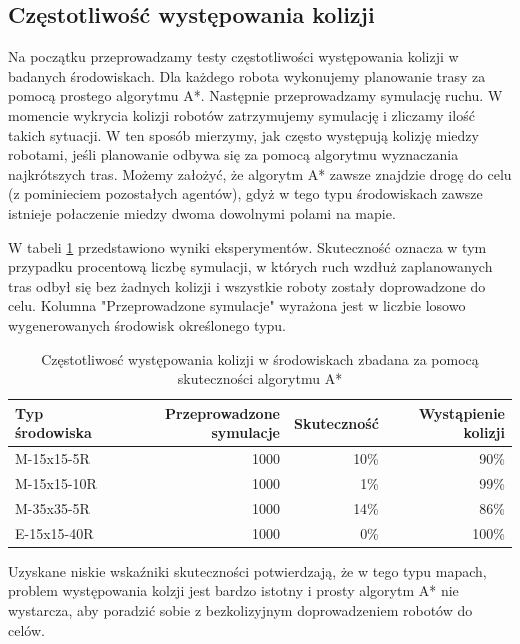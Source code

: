 \subsection{Częstotliwość występowania kolizji} %
Na początku przeprowadzamy testy częstotliwości występowania kolizji w badanych środowiskach.
Dla każdego robota wykonujemy planowanie trasy za pomocą prostego algorytmu A*. Następnie przeprowadzamy symulację ruchu. W momencie wykrycia kolizji robotów zatrzymujemy symulację i zliczamy ilość takich sytuacji. W ten sposób mierzymy, jak często występują kolizję miedzy robotami, jeśli planowanie odbywa się za pomocą algorytmu wyznaczania najkrótszych tras.
Możemy założyć, że algorytm A* zawsze znajdzie drogę do celu (z pominieciem pozostałych agentów), gdyż w tego typu środowiskach zawsze istnieje połaczenie miedzy dwoma dowolnymi polami na mapie.

W tabeli \ref{tab:test-collision-frequency} przedstawiono wyniki eksperymentów. Skuteczność oznacza w tym przypadku procentową liczbę symulacji, w których ruch wzdłuż zaplanowanych tras odbył się bez żadnych kolizji i wszystkie roboty zostały doprowadzone do celu.
Kolumna "Przeprowadzone symulacje" wyrażona jest w liczbie losowo wygenerowanych środowisk określonego typu.

\begin{table}
\caption{Częstotliwosć występowania kolizji w środowiskach zbadana za pomocą skuteczności algorytmu A*} \label{tab:test-collision-frequency} 
\centering
\begin{tabular}{| l | r | r | r |}
\hline
{\bf Typ środowiska} & {\bf Przeprowadzone symulacje} & {\bf Skuteczność} & {\bf Wystąpienie kolizji} \\ \hline
M-15x15-5R  & 1000 & 10\% & 90\% \\ \hline
M-15x15-10R & 1000 & 1\%  & 99\%  \\ \hline
M-35x35-5R  & 1000 & 14\% & 86\% \\ \hline
E-15x15-40R & 1000 & 0\%  & 100\%  \\ \hline
\end{tabular}
\end{table}

Uzyskane niskie wskaźniki skuteczności potwierdzają, że w tego typu mapach, problem występowania kolzji jest bardzo istotny i prosty algorytm A* nie wystarcza, aby poradzić sobie z bezkolizyjnym doprowadzeniem robotów do celów.

